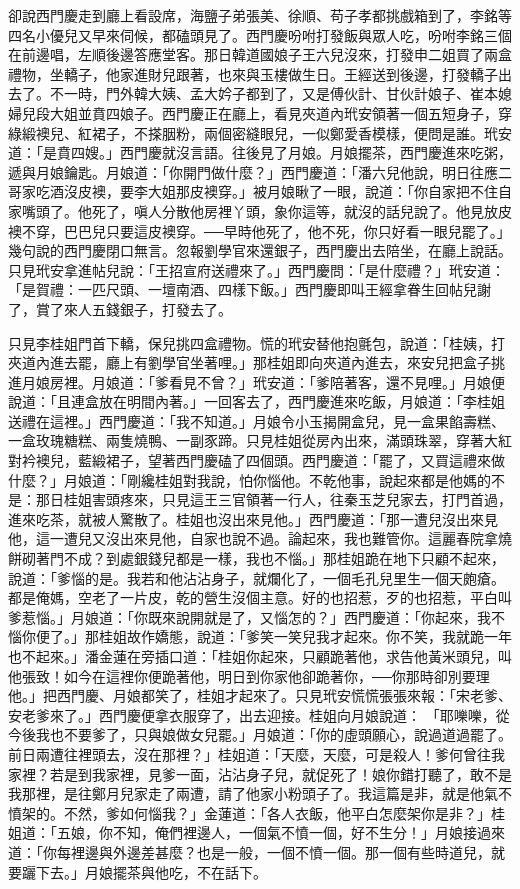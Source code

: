 卻說西門慶走到廳上看設席，海鹽子弟張美、徐順、苟子孝都挑戲箱到了，李銘等四名小優兒又早來伺候，都磕頭見了。西門慶吩咐打發飯與眾人吃，吩咐李銘三個在前邊唱，左順後邊答應堂客。那日韓道國娘子王六兒沒來，打發申二姐買了兩盒禮物，坐轎子，他家進財兒跟著，也來與玉樓做生日。王經送到後邊，打發轎子出去了。不一時，門外韓大姨、孟大妗子都到了，又是傅伙計、甘伙計娘子、崔本媳婦兒段大姐並賁四娘子。西門慶正在廳上，看見夾道內玳安領著一個五短身子，穿綠緞襖兒、紅裙子，不搽胭粉，兩個密縫眼兒，一似鄭愛香模樣，便問是誰。玳安道：「是賁四嫂。」西門慶就沒言語。往後見了月娘。月娘擺茶，西門慶進來吃粥，遞與月娘鑰匙。月娘道：「你開門做什麼？」西門慶道：「潘六兒他說，明日往應二哥家吃酒沒皮襖，要李大姐那皮襖穿。」被月娘瞅了一眼，說道：「你自家把不住自家嘴頭了。他死了，嗔人分散他房裡丫頭，象你這等，就沒的話兒說了。他見放皮襖不穿，巴巴兒只要這皮襖穿。──早時他死了，他不死，你只好看一眼兒罷了。」幾句說的西門慶閉口無言。忽報劉學官來還銀子，西門慶出去陪坐，在廳上說話。只見玳安拿進帖兒說：「王招宣府送禮來了。」西門慶問：「是什麼禮？」玳安道：「是賀禮：一匹尺頭、一壇南酒、四樣下飯。」西門慶即叫王經拿眷生回帖兒謝了，賞了來人五錢銀子，打發去了。

只見李桂姐門首下轎，保兒挑四盒禮物。慌的玳安替他抱氈包，說道：「桂姨，打夾道內進去罷，廳上有劉學官坐著哩。」那桂姐即向夾道內進去，來安兒把盒子挑進月娘房裡。月娘道：「爹看見不曾？」玳安道：「爹陪著客，還不見哩。」月娘便說道：「且連盒放在明間內著。」一回客去了，西門慶進來吃飯，月娘道：「李桂姐送禮在這裡。」西門慶道：「我不知道。」月娘令小玉揭開盒兒，見一盒果餡壽糕、一盒玫瑰糖糕、兩隻燒鴨、一副豕蹄。只見桂姐從房內出來，滿頭珠翠，穿著大紅對衿襖兒，藍緞裙子，望著西門慶磕了四個頭。西門慶道：「罷了，又買這禮來做什麼？」月娘道：「剛纔桂姐對我說，怕你惱他。不乾他事，說起來都是他媽的不是：那日桂姐害頭疼來，只見這王三官領著一行人，往秦玉芝兒家去，打門首過，進來吃茶，就被人驚散了。桂姐也沒出來見他。」西門慶道：「那一遭兒沒出來見他，這一遭兒又沒出來見他，自家也說不過。論起來，我也難管你。這麗春院拿燒餅砌著門不成？到處銀錢兒都是一樣，我也不惱。」那桂姐跪在地下只顧不起來，說道：「爹惱的是。我若和他沾沾身子，就爛化了，一個毛孔兒里生一個天皰瘡。都是俺媽，空老了一片皮，乾的營生沒個主意。好的也招惹，歹的也招惹，平白叫爹惹惱。」月娘道：「你既來說開就是了，又惱怎的？」西門慶道：「你起來，我不惱你便了。」那桂姐故作嬌態，說道：「爹笑一笑兒我才起來。你不笑，我就跪一年也不起來。」潘金蓮在旁插口道：「桂姐你起來，只顧跪著他，求告他黃米頭兒，叫他張致！如今在這裡你便跪著他，明日到你家他卻跪著你，──你那時卻別要理他。」把西門慶、月娘都笑了，桂姐才起來了。只見玳安慌慌張張來報：「宋老爹、安老爹來了。」西門慶便拿衣服穿了，出去迎接。桂姐向月娘說道： 「耶嚛嚛，從今後我也不要爹了，只與娘做女兒罷。」月娘道：「你的虛頭願心，說過道過罷了。前日兩遭往裡頭去，沒在那裡？」桂姐道：「天麼，天麼，可是殺人！爹何曾往我家裡？若是到我家裡，見爹一面，沾沾身子兒，就促死了！娘你錯打聽了，敢不是我那裡，是往鄭月兒家走了兩遭，請了他家小粉頭子了。我這篇是非，就是他氣不憤架的。不然，爹如何惱我？」金蓮道：「各人衣飯，他平白怎麼架你是非？」桂姐道：「五娘，你不知，俺們裡邊人，一個氣不憤一個，好不生分！」月娘接過來道：「你每裡邊與外邊差甚麼？也是一般，一個不憤一個。那一個有些時道兒，就要躧下去。」月娘擺茶與他吃，不在話下。

